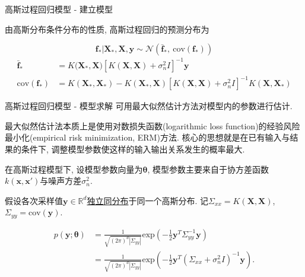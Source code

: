 \begin{frame}[fragile]{高斯过程回归模型 - 建立模型}

    由高斯分布条件分布的性质, 高斯过程回归的预测分布为

    $$\boldsymbol{f}_{*}|\boldsymbol{X}_{*},\boldsymbol{X},\boldsymbol{y}\sim\mathcal{N}(\boldsymbol{\bar{f}}_{*},\ \mathrm{cov}(\boldsymbol{f}_{*}))$$
    $$\boxed{\begin{aligned}
        \boldsymbol{\bar{f}}_{*}&=K\bigl(\boldsymbol{X}_{*},\boldsymbol{X})[K(\boldsymbol{X},\boldsymbol{X})+\sigma^{2}_{n}I]^{-1}\boldsymbol{y} \\
        \mathrm{cov}(\boldsymbol{f}_{*})&=K(\boldsymbol{X}_{*},\boldsymbol{X}_{*})-K(\boldsymbol{X}_{*},\boldsymbol{X})[K(\boldsymbol{X},\boldsymbol{X})+\sigma^{2}_{n}I]^{-1}K(\boldsymbol{X},\boldsymbol{X}_{*})
    \end{aligned}}$$

\end{frame}

\begin{frame}[fragile]{高斯过程回归模型 - 模型求解}
    可用最大似然估计方法对模型内的参数进行估计. 
    
    最大似然估计法本质上是使用对数损失函数(logarithmic loss function)的经验风险最小化(empirical risk minimization, ERM)方法. 核心的思想就是在已有输入与结果的条件下, 调整模型参数使这样的输入输出关系发生的概率最大.

    在高斯过程模型下, 设模型参数向量为$\boldsymbol{\theta}$, 模型参数主要来自于协方差函数$k(\boldsymbol{x},\boldsymbol{x}')$与噪声方差$\sigma^{2}_{n}$.
    
    假设各次采样值$\boldsymbol{y}\in\mathds{R}^{d}$\uline{独立同分布}于同一个高斯分布. 记$\Sigma_{xx}=K(\boldsymbol{X},\boldsymbol{X})$, $\Sigma_{yy}=\mathrm{cov}(\boldsymbol{y})$.

    \begin{equation}
        \begin{aligned}
            p(\boldsymbol{y};\boldsymbol{\theta}) &= \frac{1}{\sqrt{(2\pi)^{d}|\Sigma_{yy}|}}\mathrm{exp}\left(-\frac{1}{2}\boldsymbol{y}^{T}\Sigma_{yy}^{-1}\boldsymbol{y} \right) \\
            &= \frac{1}{\sqrt{(2\pi)^{d}|\Sigma_{yy}|}}\mathrm{exp}\left(-\frac{1}{2}\boldsymbol{y}^{T}( \Sigma_{xx} + \sigma^{2}_{n}I)^{-1}\boldsymbol{y} \right).
        \end{aligned}
    \end{equation}
\end{frame}

